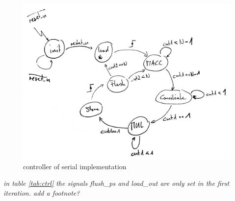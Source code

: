 \documentclass[mscthesis]{usiinfthesis}
\begin{document}
\begin{figure}
    \includegraphics[width=1\columnwidth]{./schema/arch_ctrl.png}
    \caption{controller of serial implementation}
    \label{fig:ctrl}
\end{figure}

\emph{\color{red} in table \ref{tab:ctrl} the signals flush\_ps and load\_out
are only set in the first iteration. add a footnote?}

\end{document}
